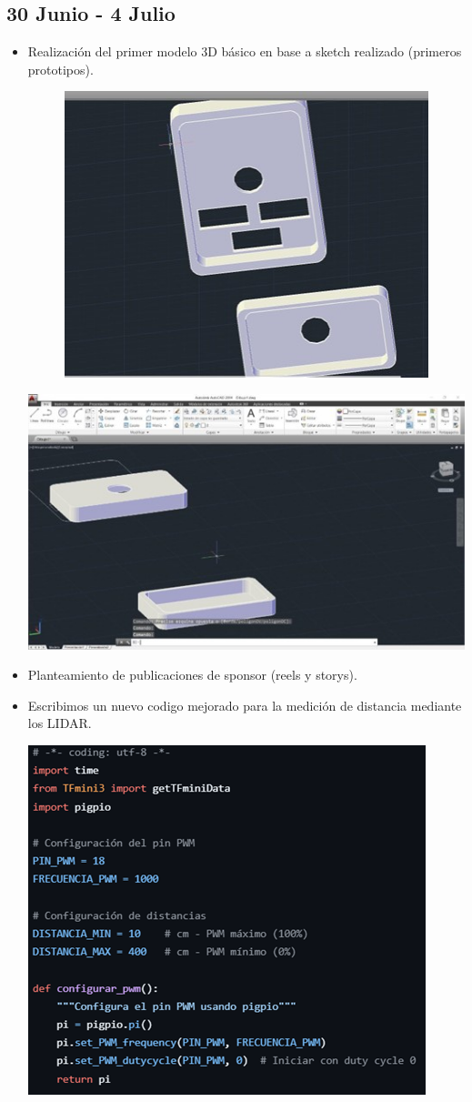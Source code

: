 \documentclass[12pt,a4paper]{article}
\begin{document}
\subsection*{30 Junio - 4 Julio}
\begin{itemize}
\item Realización del primer modelo 3D básico en base a sketch realizado (primeros prototipos).
\begin{figure}[H]
    \centering
    \includegraphics[width=0.75\linewidth]{Carpeta de campo/Imagen20.jpg}
    \label{fig:placeholder}
\end{figure}
\includegraphics[width=\linewidth]{Carpeta de campo/Imagen21.jpg}
\item Planteamiento de publicaciones de sponsor (reels y storys). 
\item Escribimos un nuevo codigo mejorado para la medición de distancia mediante los LIDAR.

\includegraphics[width=0.7\linewidth]{Carpeta de campo/Imagen19.png}


\end{itemize}
\end{document}

